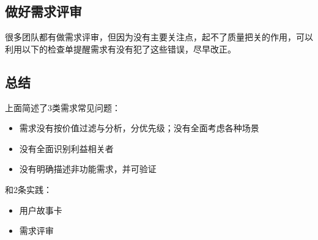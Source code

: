 \hypertarget{ux505aux597dux9700ux6c42ux8bc4ux5ba1}{%
\subsection{做好需求评审}\label{ux505aux597dux9700ux6c42ux8bc4ux5ba1}}

很多团队都有做需求评审，但因为没有主要关注点，起不了质量把关的作用，可以利用以下的检查单提醒需求有没有犯了这些错误，尽早改正。


\hypertarget{ux603bux7ed3}{%
\subsection{总结}\label{ux603bux7ed3}}

上面简述了3类需求常见问题：

\begin{itemize}
\tightlist
\item
  需求没有按价值过滤与分析，分优先级；没有全面考虑各种场景
\item
  没有全面识别利益相关者
\item
  没有明确描述非功能需求，并可验证
\end{itemize}

和2条实践：

\begin{itemize}
\tightlist
\item
  用户故事卡
\item
  需求评审
\end{itemize}

